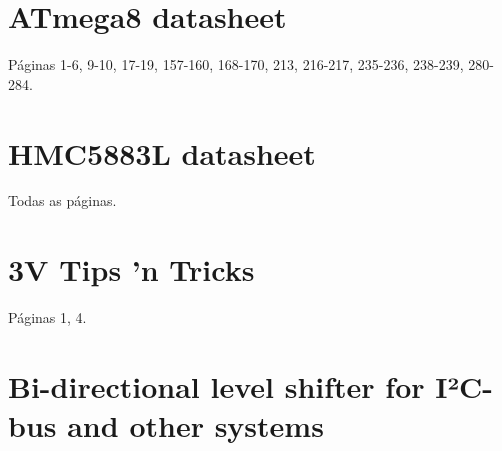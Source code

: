 \documentclass[brazil,pagestart=firstchapter]{abnt}
\begin{document}
%
%
%
%
%
%
%
%
%
%


\anexo


\chapter{ATmega8 datasheet}
\label{anx:atmega8_datasheet}

Páginas 1-6, 9-10, 17-19, 157-160, 168-170, 213, 216-217, 235-236, 238-239, 280-284. \cite{ATmega8}




\chapter{HMC5883L datasheet}
\label{anx:hmc5883l_datasheet}

Todas as páginas. \cite{HMC5883L}




\chapter{3V Tips 'n Tricks}
\label{anx:3vtipsandtricks_pdf}

Páginas 1, 4. \cite{3vtipsandtricks}




\chapter{Bi-directional level shifter for I²C-bus and other systems}
\label{anx:AN97055_pdf}
\end{document}

